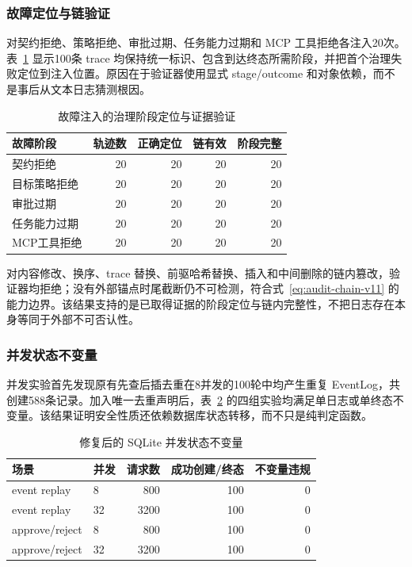 \subsubsection{故障定位与链验证}

对契约拒绝、策略拒绝、审批过期、任务能力过期和 MCP 工具拒绝各注入20次。表~\ref{tab:rq3-trace-v11} 显示100条 trace 均保持统一标识、包含到达终态所需阶段，并把首个治理失败定位到注入位置。原因在于验证器使用显式 stage/outcome 和对象依赖，而不是事后从文本日志猜测根因。

\begin{table}[htbp]
\centering
\caption{故障注入的治理阶段定位与证据验证}
\label{tab:rq3-trace-v11}
\small
\begin{tabular}{lrrrr}
\toprule
故障阶段 & 轨迹数 & 正确定位 & 链有效 & 阶段完整 \\
\midrule
契约拒绝 & 20 & 20 & 20 & 20 \\
目标策略拒绝 & 20 & 20 & 20 & 20 \\
审批过期 & 20 & 20 & 20 & 20 \\
任务能力过期 & 20 & 20 & 20 & 20 \\
MCP工具拒绝 & 20 & 20 & 20 & 20 \\
\bottomrule
\end{tabular}
\end{table}

对内容修改、换序、trace 替换、前驱哈希替换、插入和中间删除的链内篡改，验证器均拒绝；没有外部锚点时尾截断仍不可检测，符合式~\eqref{eq:audit-chain-v11} 的能力边界。该结果支持的是已取得证据的阶段定位与链内完整性，不把日志存在本身等同于外部不可否认性。

\subsubsection{并发状态不变量}

并发实验首先发现原有先查后插去重在8并发的100轮中均产生重复 EventLog，共创建588条记录。加入唯一去重声明后，表~\ref{tab:concurrency-v11} 的四组实验均满足单日志或单终态不变量。该结果证明安全性质还依赖数据库状态转移，而不只是纯判定函数。

\begin{table}[htbp]
\centering
\caption{修复后的 SQLite 并发状态不变量}
\label{tab:concurrency-v11}
\small
\begin{tabular}{llrrr}
\toprule
场景 & 并发 & 请求数 & 成功创建/终态 & 不变量违规 \\
\midrule
event replay & 8 & 800 & 100 & 0 \\
event replay & 32 & 3200 & 100 & 0 \\
approve/reject & 8 & 800 & 100 & 0 \\
approve/reject & 32 & 3200 & 100 & 0 \\
\bottomrule
\end{tabular}
\end{table}

